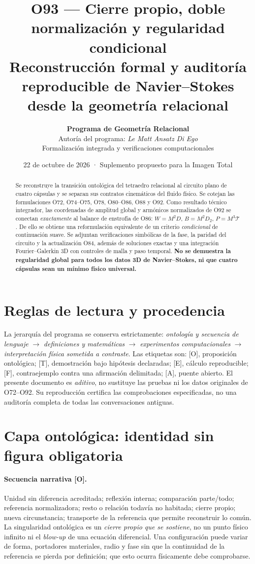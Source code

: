 \documentclass[11pt,a4paper]{article}
\title{\vspace{-1.3em}\textbf{O93 --- Cierre propio, doble normalización y regularidad condicional}\\[0.35em]
\large Reconstrucción formal y auditoría reproducible de Navier--Stokes desde la geometría relacional}
\author{\textbf{Programa de Geometría Relacional}\\Autoría del programa: \emph{Le Matt Ansatz Di Ego}\\Formalización integrada y verificaciones computacionales}
\date{22 de octubre de 2026 · Suplemento propuesto para la Imagen Total}
\theoremstyle{definition}\newtheorem{defi}[teo]{Definición}
\newcommand{\stat}[1]{\textcolor{blue!50!black}{\textsf{[#1]}}}
\begin{document}
\maketitle
\begin{abstract}
Se reconstruye la transición ontológica del tetraedro relacional al circuito plano de cuatro cápsulas y se separan sus contratos cinemáticos del fluido físico. Se cotejan las formulaciones O72, O74--O75, O78, O80--O86, O88 y O92. Como resultado técnico integrador, las coordenadas de amplitud global y armónicos normalizados de O92 se conectan \emph{exactamente} al balance de enstrofía de O86: $W=M^2D$, $B=M^2D_2$, $P=M^3\mathcal T$. De ello se obtiene una reformulación equivalente de un criterio \emph{condicional} de continuación suave. Se adjuntan verificaciones simbólicas de la fase, la paridad del circuito y la actualización O84, además de soluciones exactas y una integración Fourier--Galerkin 3D con controles de malla y paso temporal. \textbf{No se demuestra la regularidad global para todos los datos 3D de Navier--Stokes, ni que cuatro cápsulas sean un mínimo físico universal.}
\end{abstract}
\tableofcontents\bigskip

\section{Reglas de lectura y procedencia}
La jerarquía del programa se conserva estrictamente: \emph{ontología y secuencia de lenguaje} $\rightarrow$ \emph{definiciones y matemáticas} $\rightarrow$ \emph{experimentos computacionales} $\rightarrow$ \emph{interpretación física sometida a contraste}. Las etiquetas son: \stat{O}, proposición ontológica; \stat{T}, demostración bajo hipótesis declaradas; \stat{E}, cálculo reproducible; \stat{F}, contraejemplo contra una afirmación delimitada; \stat{A}, puente abierto. El presente documento es \emph{aditivo}, no sustituye las pruebas ni los datos originales de O72--O92. Su reproducción certifica las comprobaciones especificadas, no una auditoría completa de todas las conversaciones antiguas.

\section{Capa ontológica: identidad sin figura obligatoria}
\paragraph{Secuencia narrativa \stat{O}.} Unidad sin diferencia acreditada; reflexión interna; comparación parte/todo; referencia normalizadora; resto o relación todavía no habitada; cierre propio; nueva circunstancia; transporte de la referencia que permite reconstruir lo común. La singularidad ontológica es un \emph{cierre propio que se sostiene}, no un punto físico infinito ni el \emph{blow-up} de una ecuación diferencial. Una configuración puede variar de forma, portadores materiales, radio y fase sin que la continuidad de la referencia se pierda por definición; que esto ocurra físicamente debe comprobarse.
\end{document}

